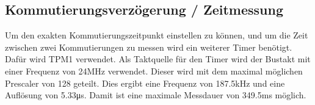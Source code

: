 \subsection{Kommutierungsverzögerung / Zeitmessung}
Um den exakten Kommutierungszeitpunkt einstellen zu können, und um die Zeit 
zwischen zwei Kommutierungen zu messen wird ein weiterer Timer benötigt. Dafür 
wird TPM1 verwendet. Als Taktquelle für den Timer wird der Bustakt mit einer 
Frequenz von 24\si{\mega\hertz} verwendet. Dieser wird mit dem maximal möglichen 
Prescaler von 128 geteilt. Dies ergibt eine Frequenz von 187.5\si{\kilo\hertz} 
und eine Auflösung von 5.33\si{\micro\second}. Damit ist eine maximale 
Messdauer von 349.5\si{\milli\second} möglich. 
